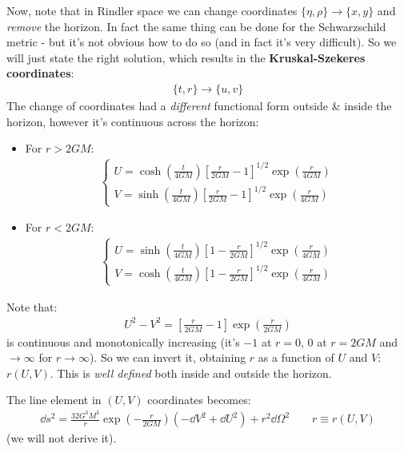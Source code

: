 \documentclass[../template.tex]{subfiles}
\begin{document}
Now, note that in Rindler space we can change coordinates $\{\eta, \rho\} \to \{x,y\}$ and \textit{remove} the horizon. In fact the same thing can be done for the Schwarzschild metric - but it's not obvious how to do so (and in fact it's very difficult). So we will just state the right solution, which results in the \textbf{Kruskal-Szekeres coordinates}:
\begin{align*}
    \{t,r\} \to \{u,v\}
\end{align*}   
The change of coordinates had a \textit{different} functional form outside \& inside the horizon, however it's continuous across the horizon:
\begin{itemize}
    \item For $r > 2GM$:
    \begin{align*}
        \begin{cases}
            U = \cosh\left(\frac{t}{4GM} \right) \left[\frac{r}{2GM} -1\right]^{1/2} \exp\left(\frac{r}{4 GM} \right)\\
            V = \sinh\left(\frac{t}{4GM} \right)\left[\frac{r}{2GM} -1 \right]^{1/2} \exp\left(\frac{r}{4 GM} \right)
        \end{cases}    
    \end{align*} 
    \item For $r < 2GM$:
    \begin{align*}
    \begin{cases}
     U = \sinh\left(\frac{t}{4GM} \right)   \left[1-\frac{r}{2GM} \right]^{1/2} \exp\left(\frac{r}{4 GM} \right)\\
     V = \cosh\left(\frac{t}{4GM} \right) \left[1-\frac{r}{2GM} \right]^{1/2} \exp\left(\frac{r}{4 GM} \right)
    \end{cases}
    \end{align*} 
\end{itemize}
Note that:
\begin{align*}
    U^2 - V^2 = \left[\frac{r}{2GM} -1 \right]\exp\left(\frac{r}{2GM} \right)
\end{align*}
is continuous and monotonically increasing (it's $-1$ at $r = 0$, $0$ at $r= 2GM$ and $ \to \infty$ for $r \to \infty$). So we can invert it, obtaining $r$ as a function of $U$ and $V$: $r(U,V)$. This is \textit{well defined} both inside and outside the horizon.


The line element in $(U,V)$ coordinates becomes:
\begin{align*}
    \dd{s}^2 = \frac{32 G^3 M^3}{r} \exp\left(-\frac{r}{2GM} \right) (-\dd{V}^2 + \dd{U}^2) + r^2 \dd{\Omega}^2 \qquad r\equiv r(U,V)
\end{align*}
(we will not derive it).
\end{document}
